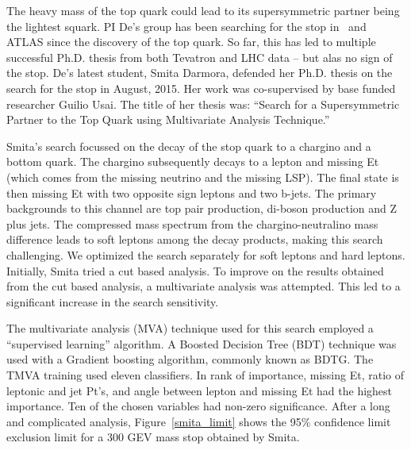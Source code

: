 
The heavy mass of the top quark could lead to its supersymmetric partner being the lightest squark. PI De's group has been searching for the stop in \ and ATLAS since the discovery of the top quark. So far, this has led to multiple successful Ph.D. thesis from both Tevatron and LHC data -- but alas no sign of the stop. De's latest student, Smita Darmora, defended her Ph.D. thesis on the search for the stop in August, 2015. Her work was co-supervised by base funded researcher Guilio Usai. The title of her thesis was: ``Search for a Supersymmetric Partner to the Top Quark using Multivariate Analysis Technique.'' 

Smita's search focussed on the decay of the stop quark to a chargino and a bottom quark. The chargino subsequently decays to a lepton and missing Et (which comes from the missing neutrino and the missing LSP). The final state is then missing Et with two opposite sign leptons and two b-jets. The primary backgrounds to this channel are top pair production, di-boson production and Z plus jets. The compressed mass spectrum from the chargino-neutralino mass difference leads to soft leptons among the decay products, making this search challenging. We optimized the search separately for soft leptons and hard leptons. Initially, Smita tried a cut based analysis. To improve on the results obtained from the cut based analysis, a multivariate analysis was attempted. This led to a significant increase in the search sensitivity.

The multivariate analysis (MVA) technique used for this search employed a ``supervised learning'' algorithm. A Boosted Decision Tree (BDT) technique was used with a Gradient boosting algorithm, commonly known as BDTG. The TMVA training used eleven classifiers. In rank of importance, missing Et, ratio of leptonic and jet Pt's, and angle between lepton and missing Et had the highest importance. Ten of the chosen variables had non-zero significance. After a long and complicated analysis, 
Figure~\ref{smita_limit} shows the 95\% confidence limit exclusion limit for a 300 GEV mass stop obtained by Smita.

